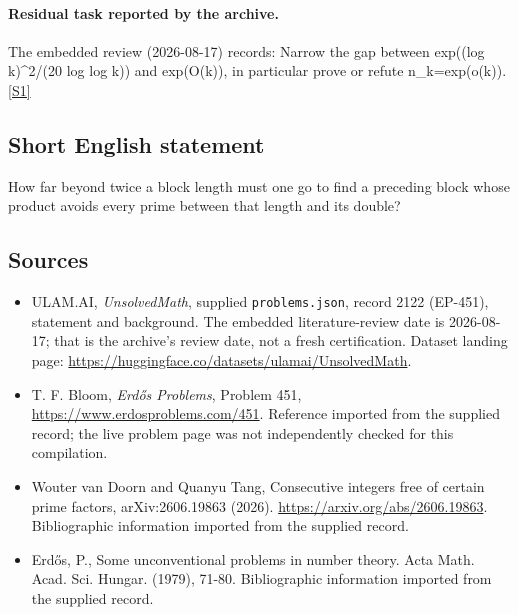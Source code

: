 \documentclass[11pt,a4paper]{article}
\newcommand{\sref}[2]{\hyperlink{source:#1:#2}{[S#2]}}
\begin{document}
\paragraph{Residual task reported by the archive.}

The embedded review (2026-08-17) records: Narrow the gap between exp((log k)\textasciicircum{}2/(20 log log k)) and exp(O(k)), in particular prove or refute n\_k=exp(o(k)). \sref{2122}{1}

\subsection{Short English statement}

How far beyond twice a block length must one go to find a preceding block whose product avoids every prime between that length and its double?

\subsection{Sources}

{\small

\begin{itemize}

\item[\hypertarget{source:2122:1}{S1}] ULAM.AI, \emph{UnsolvedMath}, supplied \texttt{problems.json}, record 2122 (EP-451), statement and background. The embedded literature-review date is 2026-08-17; that is the archive’s review date, not a fresh certification. Dataset landing page: \url{https://huggingface.co/datasets/ulamai/UnsolvedMath}.

\item[\hypertarget{source:2122:2}{S2}] T. F. Bloom, \emph{Erdős Problems}, Problem 451, \url{https://www.erdosproblems.com/451}. Reference imported from the supplied record; the live problem page was not independently checked for this compilation.

\item[\hypertarget{source:2122:3}{S3}] Wouter van Doorn and Quanyu Tang, Consecutive integers free of certain prime factors, arXiv:2606.19863 (2026). \url{https://arxiv.org/abs/2606.19863}. Bibliographic information imported from the supplied record.

\item[\hypertarget{source:2122:4}{S4}] Erd\H{o}s, P., Some unconventional problems in number theory. Acta Math. Acad. Sci. Hungar. (1979), 71-80. Bibliographic information imported from the supplied record.

\end{itemize}

}

\label{end:2122}
\end{document}
